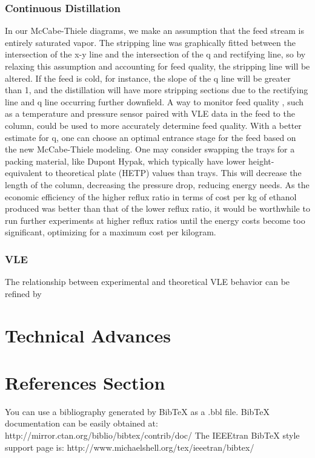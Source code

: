 \documentclass[lettersize,journal]{IEEEtran}
\begin{document}
\subsubsection{Continuous Distillation}
In our McCabe-Thiele diagrams, we make an assumption that the feed stream is entirely saturated vapor. The stripping line was graphically fitted between the intersection of the x-y line and the intersection of the q and rectifying line, so by relaxing this assumption and accounting for feed quality, the stripping line will be altered. If the feed is cold, for instance, the slope of the q line will be greater than 1, and the distillation will have more stripping sections due to the rectifying line and q line occurring further downfield. A way to monitor feed quality , such as a temperature and pressure sensor paired with VLE data in the feed to the column, could be used to more accurately determine feed quality. With a better estimate for q, one can choose an optimal entrance stage for the feed based on the new McCabe-Thiele modeling. 
One may consider swapping the trays for a packing material, like Dupont Hypak, which typically have lower height-equivalent to theoretical plate (HETP)  values than trays. This will decrease the length of the column, decreasing the pressure drop, reducing energy needs.
As the economic efficiency of the higher reflux ratio in terms of cost per kg of ethanol produced was better than that of the lower reflux ratio, it would be worthwhile to run further experiments at higher reflux ratios until the energy costs become too significant, optimizing for a maximum cost per kilogram.
\subsubsection{VLE}
The relationship between experimental and theoretical VLE behavior can be refined by 

\section{Technical Advances}





\section{References Section}
You can use a bibliography generated by BibTeX as a .bbl file.
BibTeX documentation can be easily obtained at:
http://mirror.ctan.org/biblio/bibtex/contrib/doc/
The IEEEtran BibTeX style support page is:
http://www.michaelshell.org/tex/ieeetran/bibtex/
\end{document}
